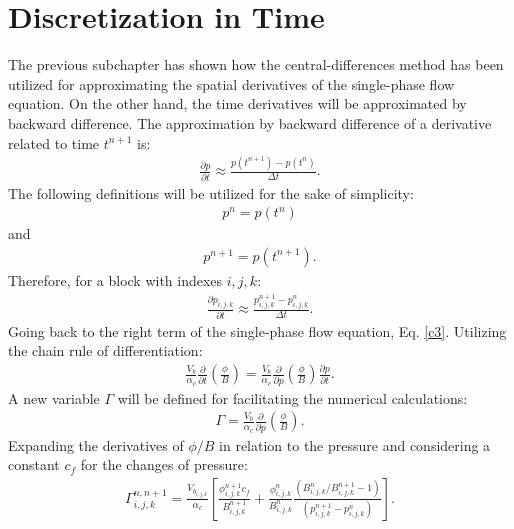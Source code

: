 \section{Discretization in Time}

The previous subchapter has shown how the central-differences method has been utilized for approximating the spatial derivatives of the single-phase flow equation. On the other hand, the time derivatives will be approximated by backward difference. The approximation by backward difference of a derivative related to time $t^{n+1}$ is:
	\begin{align}
	\label{e2.17}
	\frac{\partial p}{\partial t} \approx \frac{p(t^{n+1})-p(t^n)}{\Delta t}.
	\end{align}
The following definitions will be utilized for the sake of simplicity:
	\begin{align}
	\label{e2.18}
	p^n=p(t^n)
	\end{align}
and
	\begin{align}
	\label{e2.19}
	p^{n+1}=p(t^{n+1}).
	\end{align}
Therefore, for a block with indexes $i,j,k$:
	\begin{align}
	\label{e2.20}
	\frac{\partial p_{i,j,k}}{\partial t} \approx \frac{p_{i,j,k}^{n+1}-p_{i,j,k}^n}{\Delta t}.
	\end{align}
Going back to the right term of the single-phase flow equation, Eq. \ref{c3}. Utilizing the chain rule of differentiation:
	\begin{align}
	\label{eqGamma4}
	\frac {V_b}{\alpha_c}\frac{\partial}{\partial t}\left( \frac{\phi}{B}\right) = \frac {V_b}{\alpha_c}\frac{\partial}{\partial p}\left( \frac{\phi}{B}\right)\frac{\partial p}{\partial t}.
	\end{align}
A new variable $\Gamma$ will be defined for facilitating the numerical calculations:
	\begin{align}
	\label{eqGamma5}
	\Gamma = \frac {V_b}{\alpha_c}\frac{\partial}{\partial p}\left( \frac{\phi}{B}\right).
	\end{align}
 Expanding the derivatives of $\phi / B$ in relation to the pressure and considering a constant $c_f$ for the changes of pressure: %
	\begin{align}
	\label{eqGamma3}
	\Gamma^{n,n+1}_{i,j,k} = \frac {V_{b_{i,j,k}}}{\alpha_c} \left[ \frac{\phi^{n+1}_{i,j,k} c_f}{B^{n+1}_{i,j,k}} + \frac{\phi^n_{i,j,k}}{B^n_{i,j,k}} \frac{ \left( B^n_{i,j,k}/B^{n+1}_{i,j,k}-1\right) } { (p^{n+1}_{i,j,k} - p^{n}_{i,j,k}) } \right].
	\end{align}
